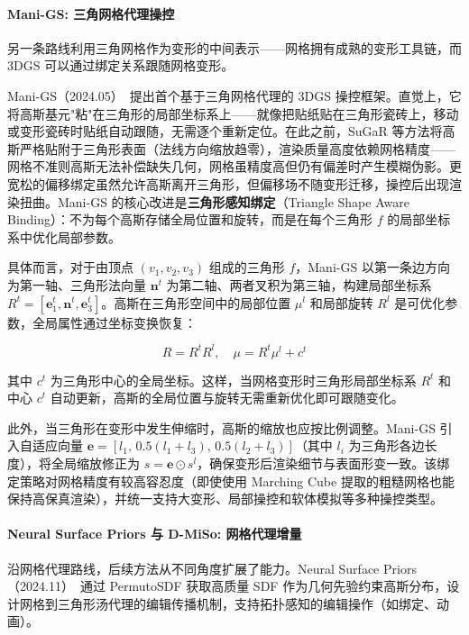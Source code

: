 \paragraph{Mani-GS: 三角网格代理操控}

另一条路线利用三角网格作为变形的中间表示——网格拥有成熟的变形工具链，而 3DGS 可以通过绑定关系跟随网格变形。

Mani-GS（2024.05）~\cite{2405_17811}提出首个基于三角网格代理的 3DGS 操控框架。直觉上，它将高斯基元"粘"在三角形的局部坐标系上——就像把贴纸贴在三角形瓷砖上，移动或变形瓷砖时贴纸自动跟随，无需逐个重新定位。在此之前，SuGaR 等方法将高斯严格贴附于三角形表面（法线方向缩放趋零），渲染质量高度依赖网格精度——网格不准则高斯无法补偿缺失几何，网格虽精度高但仍有偏差时产生模糊伪影。更宽松的偏移绑定虽然允许高斯离开三角形，但偏移场不随变形迁移，操控后出现渲染扭曲。Mani-GS 的核心改进是\textbf{三角形感知绑定}（Triangle Shape Aware Binding）：不为每个高斯存储全局位置和旋转，而是在每个三角形 $f$ 的局部坐标系中优化局部参数。

具体而言，对于由顶点 $(v_1, v_2, v_3)$ 组成的三角形 $f$，Mani-GS 以第一条边方向为第一轴、三角形法向量 $\mathbf{n}^t$ 为第二轴、两者叉积为第三轴，构建局部坐标系 $R^t = [\mathbf{e}_1^t, \mathbf{n}^t, \mathbf{e}_3^t]$。高斯在三角形空间中的局部位置 $\mu^l$ 和局部旋转 $R^l$ 是可优化参数，全局属性通过坐标变换恢复：

\begin{equation*}
R = R^t R^l, \quad \mu = R^t \mu^l + c^t
\end{equation*}

其中 $c^t$ 为三角形中心的全局坐标。这样，当网格变形时三角形局部坐标系 $R^t$ 和中心 $c^t$ 自动更新，高斯的全局位置与旋转无需重新优化即可跟随变化。

此外，当三角形在变形中发生伸缩时，高斯的缩放也应按比例调整。Mani-GS 引入自适应向量 $\mathbf{e} = [l_1, \, 0.5(l_1+l_3), \, 0.5(l_2+l_3)]$（其中 $l_i$ 为三角形各边长度），将全局缩放修正为 $s = \mathbf{e} \odot s^l$，确保变形后渲染细节与表面形变一致。该绑定策略对网格精度有较高容忍度（即使使用 Marching Cube 提取的粗糙网格也能保持高保真渲染），并统一支持大变形、局部操控和软体模拟等多种操控类型。

\paragraph{Neural Surface Priors 与 D-MiSo: 网格代理增量}

沿网格代理路线，后续方法从不同角度扩展了能力。Neural Surface Priors（2024.11）~\cite{2411_18311}通过 PermutoSDF 获取高质量 SDF 作为几何先验约束高斯分布，设计网格到三角形汤代理的编辑传播机制，支持拓扑感知的编辑操作（如绑定、动画）。

